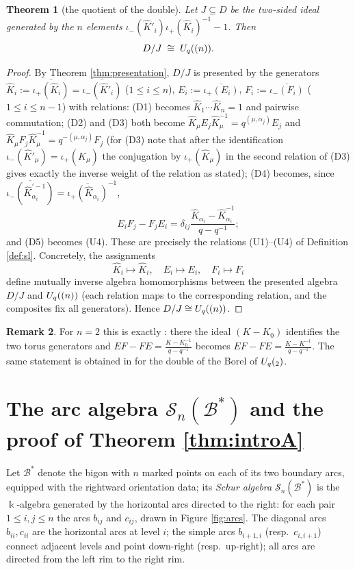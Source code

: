 \documentclass[11pt]{amsart}
\newtheorem{theorem}{Theorem}[section]
\theoremstyle{definition}
\newtheorem{remark}[theorem]{Remark}
\newcommand{\BK}{\Bbbk}
\newcommand{\SN}{\mathscr{S}_n(\mathcal{B}^*)}
\newcommand{\iop}{\iota_{+}}
\newcommand{\iom}{\iota_{-}}
\newcommand{\hK}{\hat K}
\newcommand{\al}{\alpha}
\begin{document}
\begin{theorem}[the quotient of the double]\label{thm:quotientD}
Let $J\subseteq D$ be the two-sided ideal generated by the $n$ elements
$\iom(\hK'_i)\iop(\hK_i)^{-1}-1$. Then
\[
D/J\;\cong\;U_q(\sl(n)) .
\]
\end{theorem}

\begin{proof}
By Theorem \ref{thm:presentation}, $D/J$ is presented by the generators
$\hK_i:=\overline{\iop(\hK_i)}=\overline{\iom(\hK'_i)}$ ($1\le i\le n$),
$E_i:=\overline{\iop(E_i)}$, $F_i:=\overline{\iom(F_i)}$ ($1\le i\le n-1$) with
relations: (D1) becomes $\hK_1\cdots\hK_n=1$ and pairwise commutation;
(D2) and (D3) both become
$\hK_\mu E_j\hK_\mu^{-1}=q^{(\mu,\al_j)}E_j$ and
$\hK_\mu F_j\hK_\mu^{-1}=q^{-(\mu,\al_j)}F_j$ (for (D3) note that after the
identification $\iom(\hK'_\mu)=\iop(\hK_\mu)$ the conjugation by
$\iop(\hK_\mu)$ in the second relation of (D3) gives exactly the inverse weight
of the relation as stated); (D4) becomes, since
$\overline{\iom(\hK_{\al_i}^{\prime-1})}
=\overline{\iop(\hK_{\al_i})}^{-1}$,
\[
E_iF_j-F_jE_i=\delta_{ij}\frac{\hK_{\al_i}-\hK_{\al_i}^{-1}}{q-q^{-1}};
\]
and (D5) becomes (U4). These are precisely the relations (U1)--(U4) of
Definition \ref{def:sl}. Concretely, the assignments
\[
\hK_i\mapsto\hK_i,\quad E_i\mapsto E_i,\quad F_i\mapsto F_i
\]
define mutually inverse algebra homomorphisms between the presented algebra
$D/J$ and $U_q(\sl(n))$ (each relation maps to the corresponding relation, and
the composites fix all generators). Hence $D/J\cong U_q(\sl(n))$.
\end{proof}

\begin{remark}
For $n=2$ this is exactly \cite[Cor.~2.12]{UvA}: there the ideal $(K-K_0)$
identifies the two torus generators and
$EF-FE=\frac{K-K_0^{-1}}{q-q^{-1}}$ becomes
$EF-FE=\frac{K-K^{-1}}{q-q^{-1}}$. The same statement is obtained in
\cite{Z} for the double of the Borel of $U_q(\sl_2)$.
\end{remark}

\section{The arc algebra $\SN$ and the proof of Theorem \ref{thm:introA}}
\label{sec:arcs}

Let $\mathcal{B}^*$ denote the bigon with $n$ marked points on each of its two
boundary arcs, equipped with the rightward orientation data; its \emph{Schur
algebra} $\SN$ is the $\BK$-algebra generated by the horizontal arcs directed
to the right: for each pair $1\le i,j\le n$ the arcs $b_{ij}$ and $c_{ij}$,
drawn in Figure \ref{fig:arcs}. The diagonal arcs $b_{ii},c_{ii}$ are the
horizontal arcs at level $i$; the simple arcs $b_{i+1,i}$ (resp.\
$c_{i,i+1}$) connect adjacent levels and point down-right (resp.\ up-right); all
arcs are directed from the left rim to the right rim.
\end{document}
